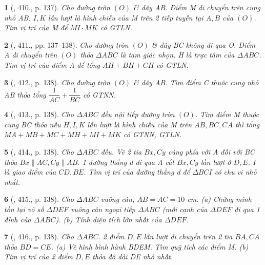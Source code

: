 \documentclass{article}
\newtheorem{baitoan}{}
\begin{document}
\begin{baitoan}[\cite{Binh_Toan_9_tap_2}, 410., p. 137]
	Cho đường tròn $(O)$ \& dây AB. Điểm M di chuyển trên cung nhỏ AB. $I,K$ lần lượt là hình chiếu của M trên 2 tiếp tuyến tại $A,B$ của $(O)$. Tìm vị trí của M để $MI\cdot MK$ có {\rm GTLN}.
\end{baitoan}

\begin{baitoan}[\cite{Binh_Toan_9_tap_2}, 411., pp. 137--138]
	Cho đường tròn $(O)$ \& dây BC không đi qua O. Điểm A di chuyển trên $(O)$ thỏa $\Delta ABC$ là tam giác nhọn. H là trực tâm của $\Delta ABC$. Tìm vị trí của điểm A để tổng $AH + BH + CH$ có {\rm GTLN}.
\end{baitoan}

\begin{baitoan}[\cite{Binh_Toan_9_tap_2}, 412., p. 138]
	Cho đường tròn $(O)$ \& dây AB. Tìm điểm C thuộc cung nhỏ AB thỏa tổng $\dfrac{1}{AC} + \dfrac{1}{BC}$ có {\rm GTNN}.
\end{baitoan}

\begin{baitoan}[\cite{Binh_Toan_9_tap_2}, 413., p. 138]
	Cho $\Delta ABC$ đều nội tiếp đường tròn $(O)$. Tìm điểm M thuộc cung BC thỏa nếu $H,I,K$ lần lượt là hình chiếu của M trên $AB,BC,CA$ thì tổng $MA + MB + MC + MH + MI + MK$ có {\rm GTNN, GTLN}.
\end{baitoan}

\begin{baitoan}[\cite{Binh_Toan_9_tap_2}, 414., p. 138]
	Cho $\Delta ABC$ đều. Vẽ 2 tia $Bx,Cy$ cùng phía với A đối với BC thỏa $Bx\parallel AC,Cy\parallel AB$. 1 đường thẳng d đi qua A cắt $Bx,Cy$ lần lượt ở $D,E$. I là giao điểm của $CD,BE$. Tìm vị trí của đường thẳng d để $\Delta BCI$ có chu vi nhỏ nhất.
\end{baitoan}

\begin{baitoan}[\cite{Binh_Toan_9_tap_2}, 415., p. 138]
	Cho $\Delta ABC$ vuông cân, $AB = AC = 10$ {\rm cm}. (a) Chứng minh tồn tại vô số $\Delta DEF$ vuông cân ngoại tiếp $\Delta ABC$ (mỗi cạnh của $\Delta DEF$ đi qua 1 đỉnh của $\Delta ABC$). (b) Tính diện tích lớn nhất của $\Delta DEF$.
\end{baitoan}

\begin{baitoan}[\cite{Binh_Toan_9_tap_2}, 416., p. 138]
	Cho $\Delta ABC$. 2 điểm $D,E$ lần lượt di chuyển trên 2 tia $BA,CA$ thỏa $BD = CE$. (a) Vẽ hình bình hành BDEM. Tìm quỹ tích các điểm M. (b) Tìm vị trí của 2 điểm $D,E$ thỏa độ dài DE nhỏ nhất.
\end{baitoan}
\end{document}
